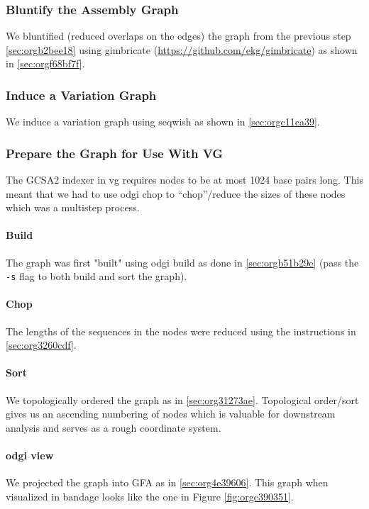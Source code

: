 \documentclass[10pt, a4paper]{article}
\begin{document}
\subsubsection{Bluntify the Assembly Graph}
\label{sec:org83aa351}
We bluntified (reduced overlaps on the edges) the graph 
\cite{gargGraphbasedApproachDiploid2018} from the previous step
\ref{sec:orgb2bee18} using gimbricate
(\url{https://github.com/ekg/gimbricate}) as shown in \ref{sec:orgf68bf7f}.

\subsubsection{Induce a Variation Graph}
\label{sec:orgacda3eb}
We induce a variation graph using seqwish as shown in \ref{sec:orgc11ca39}.

\subsubsection{Prepare the Graph for Use With VG}
\label{sec:org77d76d4}
The GCSA2  indexer in vg requires nodes to be at
most 1024 base pairs long.
This meant that we had to use odgi chop to “chop”/reduce the sizes of these
nodes which was a multistep process.

\paragraph{Build}
\label{sec:orgca8bb7d}
The graph was first "built" using odgi build as done in \ref{sec:orgb51b29e} 
(pass the \texttt{-s} flag to both build and sort the graph).

\paragraph{Chop}
\label{sec:orgccba506}
The lengths of the sequences in the nodes were reduced using the instructions in
\ref{sec:org3260cdf}.

\paragraph{Sort}
\label{sec:org00714da}
We topologically ordered the graph as in \ref{sec:org31273ae}.
Topological order/sort gives us an ascending numbering of nodes which is 
valuable for downstream analysis and serves as a rough coordinate system.


\paragraph{odgi view}
\label{sec:org1fc6263}
We projected the graph into GFA as in \ref{sec:org4e39606}. 
This graph when visualized in bandage looks like the one in
Figure \ref{fig:orgc390351}.
\end{document}
